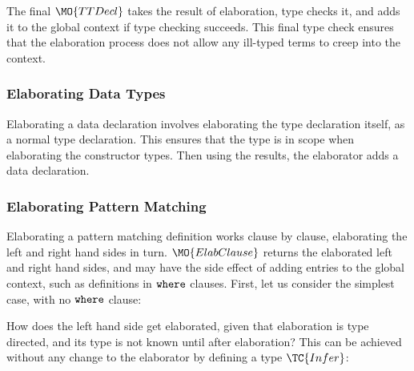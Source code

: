The final $\MO{TTDecl}$ takes the result of elaboration, type checks it,
and adds it to the global context if type checking succeeds. This final type check
ensures that the elaboration process does not allow any ill-typed terms to creep
into the context.

\subsubsection{Elaborating Data Types}

Elaborating a data declaration involves elaborating the type declaration itself,
as a normal type declaration. This ensures that the type is in scope when
elaborating the constructor types. Then using the results, the elaborator
adds a \TT{} data declaration.


\subsubsection{Elaborating Pattern Matching}

Elaborating a pattern matching definition works clause by clause, elaborating
the left and right hand sides in turn. $\MO{ElabClause}$ returns the elaborated
left and right hand sides, and may have the side effect of adding entries
to the global context, such as definitions in $\mathtt{where}$ clauses.
First, let us consider the simplest case, with no $\mathtt{where}$ clause:


How does the left hand side get elaborated, given that elaboration is type directed, and
its type is not known until after elaboration? 
This can be achieved without any change to the elaborator by defining 
a type $\TC{Infer}$:


